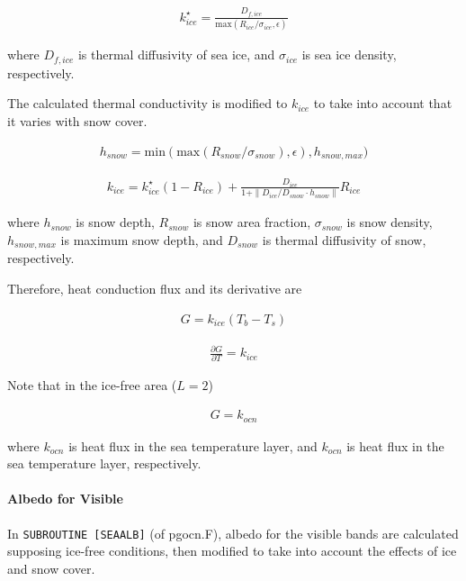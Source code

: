 \begin{eqnarray}
k_{ice}^\star = \frac{D_{f,ice}}{\mathrm{max}(R_{ice}/\sigma_{ice}, \epsilon)}
\end{eqnarray}

where \(D_{f,ice}\) is thermal diffusivity of sea ice, and \(\sigma_{ice}\) is sea ice density, respectively.

The calculated thermal conductivity is modified to \(k_{ice}\) to take into account that it varies with snow cover.

\begin{eqnarray}
h_{snow} = \mathrm{min}(
    \mathrm{max}(
    R_{snow}/\sigma_{snow}),\epsilon
        ),h_{snow,max}
        )
\end{eqnarray}

\begin{eqnarray}      
k_{ice} = k_{ice}^\star (1-R_{ice}) + \frac{D_{ice}}{1+\| D_{ice}/D_{snow} \cdot h_{snow} \|} R_{ice}
\end{eqnarray}

where \(h_{snow}\) is snow depth, \(R_{snow}\) is snow area fraction, \(\sigma_{snow}\) is snow density, \(h_{snow,max}\) is maximum snow depth, and \(D_{snow}\) is thermal diffusivity of snow,
respectively.

Therefore, heat conduction flux and its derivative are

\begin{eqnarray}
 G = k_{ice} (T_b - T_s)
\end{eqnarray}

\begin{eqnarray}
 \frac{\partial G}{\partial T} = k_{ice}
\end{eqnarray}

Note that in the ice-free area (\(L=2\))

\begin{eqnarray}
G=k_{ocn}
\end{eqnarray}

where \(k_{ocn}\) is heat flux in the sea temperature layer, and \(k_{ocn}\) is heat flux in the sea temperature layer, respectively.

\hypertarget{albedo-for-visible}{%
\paragraph{Albedo for Visible}\label{albedo-for-visible}}

In \texttt{SUBROUTINE\ {[}SEAALB{]}} (of pgocn.F), albedo for the visible bands are calculated supposing ice-free conditions, then modified to take into account the effects of ice and snow cover.

